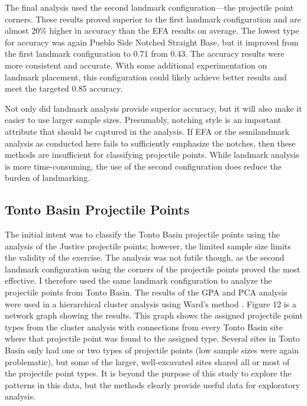 \documentclass[letterpaper]{article}
\begin{document}
The final analysis used the second landmark configuration---the projectile point corners. These results proved superior to the first landmark configuration and are almost 20\% higher in accuracy than the EFA results on average. The lowest type for accuracy was again Pueblo Side Notched Straight Base, but it improved from the first landmark configuration to 0.71 from 0.43. The accuracy results were more consistent and accurate. With some additional experimentation on landmark placement, this configuration could likely achieve better results and meet the targeted 0.85 accuracy.

Not only did landmark analysis provide superior accuracy, but it will also make it easier to use larger sample sizes. Presumably, notching style is an important attribute that should be captured in the analysis. If EFA or the semilandmark analysis as conducted here fails to sufficiently emphasize the notches, then these methods are insufficient for classifying projectile points. While landmark analysis is more time-consuming, the use of the second configuration does reduce the burden of landmarking.

\hypertarget{tonto-basin-projectile-points-1}{%
\subsection*{Tonto Basin Projectile Points}\label{tonto-basin-projectile-points-1}}

The initial intent was to classify the Tonto Basin projectile points using the analysis of the Justice projectile points; however, the limited sample size limits the validity of the exercise. The analysis was not futile though, as the second landmark configuration using the corners of the projectile points proved the most effective. I therefore used the same landmark configuration to analyze the projectile points from Tonto Basin. The results of the GPA and PCA analysis were used in a hierarchical cluster analysis using Ward's method \autocite[see][]{Murtagh2014-mb}. Figure 12 is a network graph showing the results. This graph shows the assigned projectile point types from the cluster analysis with connections from every Tonto Basin site where that projectile point was found to the assigned type. Several sites in Tonto Basin only had one or two types of projectile points (low sample sizes were again problematic), but some of the larger, well-excavated sites shared all or most of the projectile point types. It is beyond the purpose of this study to explore the patterns in this data, but the methods clearly provide useful data for exploratory analysis.
\end{document}
